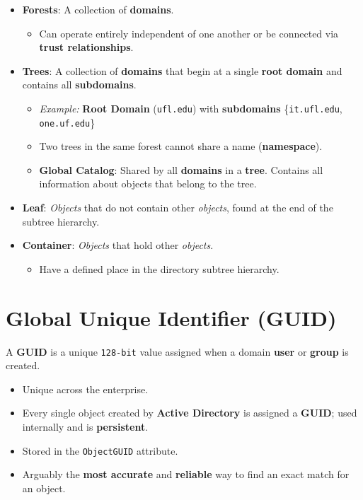\documentclass[12pt, letterpaper]{article}
\begin{document}
\begin{itemize}
\begin{itemize}
        \end{itemize}
    \item \textbf{Forests}: A collection of \textbf{domains}.
        \begin{itemize}
            \item Can operate entirely independent of one another or be connected via \textbf{trust relationships}.
        \end{itemize}
    \item \textbf{Trees}: A collection of \textbf{domains} that begin at a single \textbf{root domain} and contains all \textbf{subdomains}.
        \begin{itemize}
            \item \textit{Example:} \textbf{Root Domain} (\texttt{ufl.edu}) with \textbf{subdomains} \{\texttt{it.ufl.edu}, \texttt{one.uf.edu}\}
            \item Two trees in the same forest cannot share a name (\textbf{namespace}).
            \item \textbf{Global Catalog}: Shared by all \textbf{domains} in a \textbf{tree}. Contains all information about objects that belong to the tree.
        \end{itemize}
    \item \textbf{Leaf}: \textit{Objects} that do not contain other \textit{objects}, found at the end of the subtree hierarchy.
    \item \textbf{Container}: \textit{Objects} that hold other \textit{objects}.
        \begin{itemize}
            \item Have a defined place in the directory subtree hierarchy.
        \end{itemize}
\end{itemize}

\section*{Global Unique Identifier (GUID)}

A \textbf{GUID} is a unique \texttt{128-bit} value assigned when a domain \textbf{user} or \textbf{group} is created.
\begin{itemize}
    \item Unique across the enterprise.
    \item Every single object created by \textbf{Active Directory} is assigned a \textbf{GUID}; used internally and is \textbf{persistent}.
    \item Stored in the \texttt{ObjectGUID} attribute.
    \item Arguably the \textbf{most accurate} and \textbf{reliable} way to find an exact match for an object.
\end{itemize}
\end{document}
